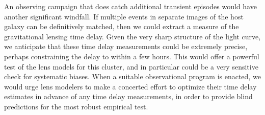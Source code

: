 An observing campaign that does catch additional transient episodes
would have another significant windfall.  If multiple events in
separate images of the host galaxy can be definitively matched, then
we could extract a measure of the gravitational lensing time delay.
Given the very sharp structure of the light curve, we anticipate that
these time delay measurements could be extremely precise, perhaps
constraining the delay to within a few hours.  This would offer a
powerful test of the lens models for this cluster, and in particular
could be a very sensitive check for systematic biases.  When a
suitable observational program is enacted, we would urge lens modelers
to make a concerted effort to optimize their time delay estimates in
advance of any time delay measurements, in order to provide blind
predictions for the most robust empirical test.

